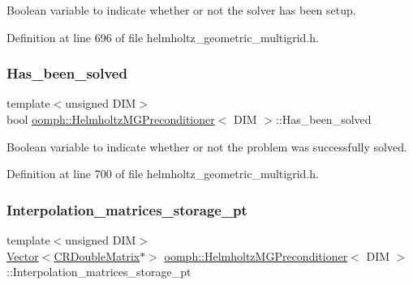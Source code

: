 Boolean variable to indicate whether or not the solver has been setup. 



Definition at line 696 of file helmholtz\+\_\+geometric\+\_\+multigrid.\+h.

\mbox{\label{classoomph_1_1HelmholtzMGPreconditioner_ad388b2b7f4f099f5bc478dfc7088c1a2}} 
\subsubsection{\texorpdfstring{Has\+\_\+been\+\_\+solved}{Has\_been\_solved}}
{\footnotesize\ttfamily template$<$unsigned D\+IM$>$ \\
bool \hyperlink{classoomph_1_1HelmholtzMGPreconditioner}{oomph\+::\+Helmholtz\+M\+G\+Preconditioner}$<$ D\+IM $>$\+::Has\+\_\+been\+\_\+solved\hspace{0.3cm}{\ttfamily [private]}}



Boolean variable to indicate whether or not the problem was successfully solved. 



Definition at line 700 of file helmholtz\+\_\+geometric\+\_\+multigrid.\+h.

\mbox{\label{classoomph_1_1HelmholtzMGPreconditioner_a661811aae02c456b338964cb5e918e70}} 
\subsubsection{\texorpdfstring{Interpolation\+\_\+matrices\+\_\+storage\+\_\+pt}{Interpolation\_matrices\_storage\_pt}}
{\footnotesize\ttfamily template$<$unsigned D\+IM$>$ \\
\hyperlink{classoomph_1_1Vector}{Vector}$<$\hyperlink{classoomph_1_1CRDoubleMatrix}{C\+R\+Double\+Matrix}$\ast$$>$ \hyperlink{classoomph_1_1HelmholtzMGPreconditioner}{oomph\+::\+Helmholtz\+M\+G\+Preconditioner}$<$ D\+IM $>$\+::Interpolation\+\_\+matrices\+\_\+storage\+\_\+pt\hspace{0.3cm}{\ttfamily [private]}}



